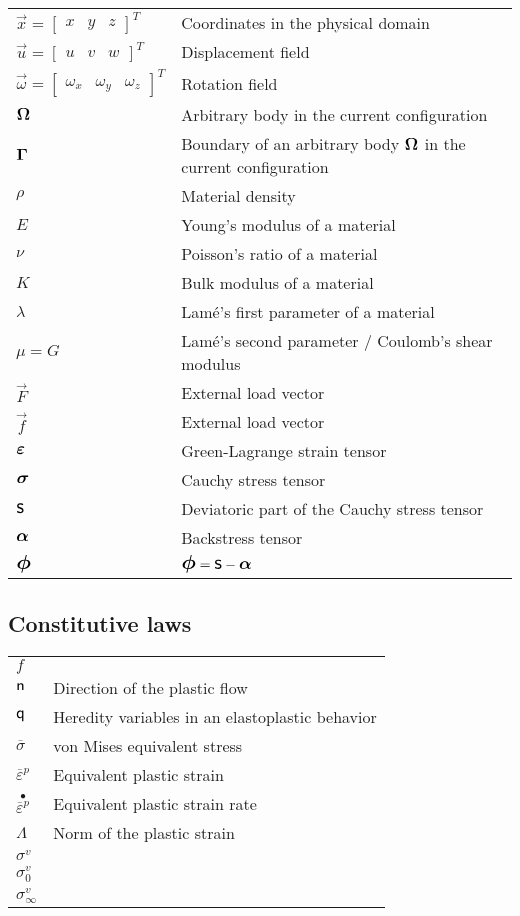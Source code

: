\begin{longtable}[l]{>{\raggedright}p{0.2\paperwidth}>{\raggedright}p{0.8\paperwidth}}
$\overrightarrow{x}=\left[\begin{array}{ccc}
x & y & z\end{array}\right]^{T}$ & Coordinates in the physical domain\tabularnewline
$\overrightarrow{u}=\left[\begin{array}{ccc}
u & v & w\end{array}\right]^{T}$ & Displacement field\tabularnewline
$\overrightarrow{\omega}=\left[\begin{array}{ccc}
\omega_{x} & \omega_{y} & \omega_{z}\end{array}\right]^{T}$ & Rotation field\tabularnewline
$\mbox{\large\ensuremath{\boldsymbol{\Omega}}}$ & Arbitrary body in the current configuration\tabularnewline
$\mbox{\large\ensuremath{\boldsymbol{\Gamma}}}$ & Boundary of an arbitrary body $\mbox{\large\ensuremath{\boldsymbol{\Omega}}}$ in the current configuration\tabularnewline
$\rho$ & Material density\tabularnewline
$E$ & Young's modulus of a material\tabularnewline
$\nu$ & Poisson's ratio of a material\tabularnewline
$K$ & Bulk modulus of a material\tabularnewline
$\lambda$ & Lamé's first parameter of a material\tabularnewline
$\mu=G$ & Lamé's second parameter / Coulomb's shear modulus\tabularnewline
$\overrightarrow{F}$ & External load vector\tabularnewline
$\overrightarrow{f}$ & External load vector\tabularnewline
$\mbox{\large\ensuremath{\boldsymbol{\varepsilon}}}$ & Green-Lagrange strain tensor\tabularnewline
$\mbox{\large\ensuremath{\boldsymbol{\sigma}}}$ & Cauchy stress tensor\tabularnewline
$\mbox{\Large\ensuremath{\mathsf{s}}}$ & Deviatoric part of the Cauchy stress tensor\tabularnewline
$\mbox{\large\ensuremath{\boldsymbol{\alpha}}}$ & Backstress tensor\tabularnewline
$\mbox{\Large\ensuremath{\boldsymbol{\phi}}}$ & $\mbox{\Large\ensuremath{\boldsymbol{\phi}}}=\mbox{\Large\ensuremath{\mathsf{s}}}-\mbox{\large\ensuremath{\boldsymbol{\alpha}}}$\tabularnewline
\end{longtable}

\subsection*{Constitutive laws\vspace{-1ex}}

\begin{longtable}[l]{>{\raggedright}p{0.2\paperwidth}>{\raggedright}p{0.8\paperwidth}}
$f$ & \tabularnewline
$\mbox{\large\ensuremath{\mathsf{n}}}$ & Direction of the plastic flow\tabularnewline
$\mbox{\large\ensuremath{\mathsf{q}}}$ & Heredity variables in an elastoplastic behavior\tabularnewline
$\overline{\sigma}$ & von Mises equivalent stress\tabularnewline
$\overline{\varepsilon}^{p}$ & Equivalent plastic strain\tabularnewline
$\stackrel{\bullet}{\overline{\varepsilon}^{p}}$ & Equivalent plastic strain rate\tabularnewline
$\Lambda$ & Norm of the plastic strain\tabularnewline
$\sigma^{v}$ & \tabularnewline
$\sigma_{0}^{v}$ & \tabularnewline
$\sigma_{\infty}^{v}$ & \tabularnewline
\end{longtable}

